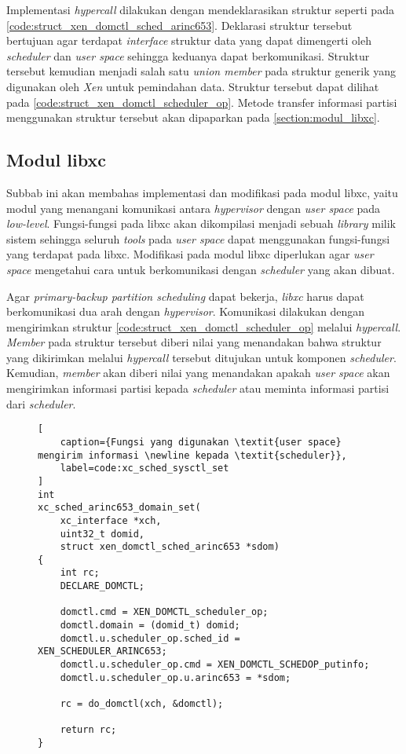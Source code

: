 Implementasi \textit{hypercall} dilakukan dengan mendeklarasikan struktur seperti pada
\autoref{code:struct_xen_domctl_sched_arinc653}. Deklarasi struktur tersebut bertujuan agar
terdapat \textit{interface} struktur data yang dapat dimengerti oleh \textit{scheduler} dan
\textit{user space} sehingga keduanya dapat berkomunikasi. Struktur tersebut kemudian menjadi
salah satu \textit{union member} pada struktur generik yang digunakan oleh \textit{Xen} untuk
pemindahan data. Struktur tersebut dapat dilihat pada
\autoref{code:struct_xen_domctl_scheduler_op}. Metode transfer informasi partisi menggunakan
struktur tersebut akan dipaparkan pada \autoref{section:modul_libxc}.

\subsection{Modul libxc}
\label{section:modul_libxc}

Subbab ini akan membahas implementasi dan modifikasi pada modul libxc, yaitu modul yang
menangani komunikasi antara \textit{hypervisor} dengan \textit{user space} pada
\textit{low-level}. Fungsi-fungsi pada libxc akan dikompilasi menjadi sebuah \textit{library}
milik sistem sehingga seluruh \textit{tools} pada \textit{user space} dapat menggunakan
fungsi-fungsi yang terdapat pada libxc. Modifikasi pada modul libxc diperlukan agar \textit{user
space} mengetahui cara untuk berkomunikasi dengan \textit{scheduler} yang akan dibuat.

Agar \textit{primary-backup partition scheduling} dapat bekerja, \textit{libxc} harus dapat
berkomunikasi dua arah dengan \textit{hypervisor}. Komunikasi dilakukan dengan mengirimkan
struktur \autoref{code:struct_xen_domctl_scheduler_op} melalui \textit{hypercall}.
\textit{Member}  pada struktur tersebut diberi nilai yang menandakan bahwa
struktur yang dikirimkan melalui \textit{hypercall} tersebut ditujukan untuk komponen
\textit{scheduler}. Kemudian, \textit{member}  akan diberi nilai yang menandakan
apakah \textit{user space} akan mengirimkan informasi partisi kepada \textit{scheduler} atau
meminta informasi partisi dari \textit{scheduler}.

\begin{figure}
\begin{lstlisting}[
	caption={Fungsi yang digunakan \textit{user space} mengirim informasi \newline kepada \textit{scheduler}},
	label=code:xc_sched_sysctl_set
]
int
xc_sched_arinc653_domain_set(
    xc_interface *xch,
    uint32_t domid,
    struct xen_domctl_sched_arinc653 *sdom)
{
    int rc;
    DECLARE_DOMCTL;

    domctl.cmd = XEN_DOMCTL_scheduler_op;
    domctl.domain = (domid_t) domid;
    domctl.u.scheduler_op.sched_id = XEN_SCHEDULER_ARINC653;
    domctl.u.scheduler_op.cmd = XEN_DOMCTL_SCHEDOP_putinfo;
    domctl.u.scheduler_op.u.arinc653 = *sdom;

    rc = do_domctl(xch, &domctl);

    return rc;
}
\end{lstlisting}
\end{figure}

